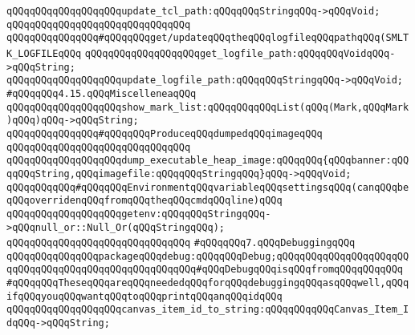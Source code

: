 \verb|qQQqqQQqqQQqqQQqqQQqupdate_tcl_path:qQQqqQQqStringqQQq->qQQqVoid;|\newline
\verb|qQQqqQQqqQQqqQQqqQQqqQQqqQQqqQQq|\newline
\verb|qQQqqQQqqQQqqQQq#qQQqqQQqget/updateqQQqtheqQQqlogfileqQQqpathqQQq(SMLTK_LOGFILEqQQq|\newline
\verb|qQQqqQQqqQQqqQQqqQQqget_logfile_path:qQQqqQQqVoidqQQq->qQQqString;|\newline
\verb|qQQqqQQqqQQqqQQqqQQqupdate_logfile_path:qQQqqQQqStringqQQq->qQQqVoid;|\newline
\newline
\verb|#qQQqqQQq4.15.qQQqMiscelleneaqQQq|\newline
\newline
\verb|qQQqqQQqqQQqqQQqqQQqshow_mark_list:qQQqqQQqqQQqList(qQQq(Mark,qQQqMark)qQQq)qQQq->qQQqString;|\newline
\newline
\verb|qQQqqQQqqQQqqQQq#qQQqqQQqProduceqQQqdumpedqQQqimageqQQq|\newline
\verb|qQQqqQQqqQQqqQQqqQQqqQQqqQQqqQQq|\newline
\verb|qQQqqQQqqQQqqQQqqQQqdump_executable_heap_image:qQQqqQQq{qQQqbanner:qQQqqQQqString,qQQqimagefile:qQQqqQQqStringqQQq}qQQq->qQQqVoid;|\newline
\newline
\verb|qQQqqQQqqQQq#qQQqqQQqEnvironmentqQQqvariableqQQqsettingsqQQq(canqQQqbeqQQqoverridenqQQqfromqQQqtheqQQqcmdqQQqline)qQQq|\newline
\newline
\verb|qQQqqQQqqQQqqQQqqQQqgetenv:qQQqqQQqStringqQQq->qQQqnull_or::Null_Or(qQQqStringqQQq);|\newline
\newline
\verb|qQQqqQQqqQQqqQQqqQQqqQQqqQQqqQQq|\newline
\verb|#qQQqqQQq7.qQQqDebuggingqQQq|\newline
\newline
\verb|qQQqqQQqqQQqqQQqpackageqQQqdebug:qQQqqQQqDebug;qQQqqQQqqQQqqQQqqQQqqQQqqQQqqQQqqQQqqQQqqQQqqQQqqQQqqQQq#qQQqDebugqQQqisqQQqfromqQQqqQQqqQQq|\newline
\newline
\verb|#qQQqqQQqTheseqQQqareqQQqneededqQQqforqQQqdebuggingqQQqasqQQqwell,qQQqifqQQqyouqQQqwantqQQqtoqQQqprintqQQqanqQQqidqQQq|\newline
\verb|qQQqqQQqqQQqqQQqqQQqcanvas_item_id_to_string:qQQqqQQqqQQqCanvas_Item_IdqQQq->qQQqString;|\newline
